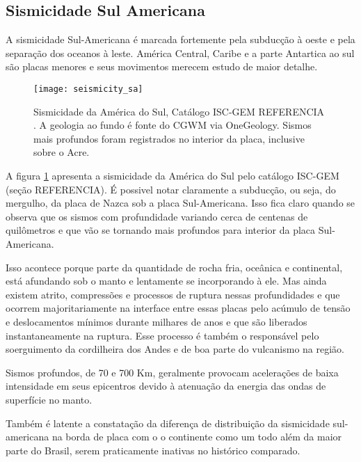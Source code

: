\subsection{Sismicidade Sul Americana}
\label{sec:03_america_do_sul_seismicity}

A sismicidade Sul-Americana é marcada fortemente pela subducção à oeste e pela 
separação dos oceanos à leste. América Central, Caribe e a parte Antartica ao sul
são placas menores e seus movimentos merecem estudo de maior detalhe.

\begin{figure}[H]
  \centering
  \texttt{[image: seismicity\_sa]} 
  \caption{Sismicidade da América do Sul, Catálogo ISC-GEM  REFERENCIA . 
  			A geologia ao fundo é fonte do CGWM via OneGeology.
		   Sismos mais profundos foram registrados no interior da placa, inclusive sobre o Acre.
  		   }
  \label{fig:sa_seis} 
\end{figure}

A figura \ref{fig:sa_seis} apresenta a sismicidade da América do Sul pelo catálogo ISC-GEM
(seção REFERENCIA). É possivel notar claramente a subducção, ou seja, do mergulho, da placa de Nazca sob a placa
Sul-Americana. Isso fica claro quando se observa que os sismos com profundidade variando cerca de centenas de quilômetros 
e que vão se tornando mais profundos para interior da placa Sul-Americana.

Isso acontece porque parte da quantidade de rocha fria, oceânica e continental, está afundando sob o manto
e lentamente se incorporando à ele. Mas ainda existem atrito, compressões e processos de ruptura nessas
profundidades e que ocorrem majoritariamente na interface entre essas placas pelo acúmulo de tensão e deslocamentos 
mínimos durante milhares de anos e que são liberados instantaneamente na ruptura. 
Esse processo é também o responsável pelo soerguimento da 
cordilheira dos Andes e de boa parte do vulcanismo na região. 

Sismos profundos, de 70 e 700 Km, geralmente provocam acelerações de baixa intensidade em seus epicentros 
devido à atenuação da energia das ondas de superfície no manto.

Também é latente a constatação da diferença de distribuição da sismicidade sul-americana na borda de placa com o
o continente como um todo além da maior parte do Brasil, serem praticamente inativas no histórico comparado.

